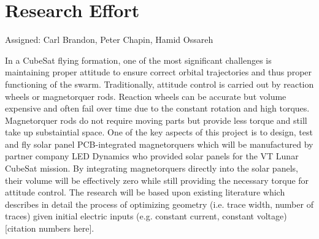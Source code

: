 \section{Research Effort}
Assigned: Carl Brandon, Peter Chapin, Hamid Ossareh

In a CubeSat flying formation, one of the most significant challenges
is maintaining proper attitude to ensure correct orbital trajectories
and thus proper functioning of the swarm. Traditionally, attitude
control is carried out by reaction wheels or magnetorquer
rods. Reaction wheels can be accurate but volume expensive and often
fail over time due to the constant rotation and high
torques. Magnetorquer rods do not require moving parts but provide
less torque and still take up substaintial space. One of the key
aspects of this project is to design, test and fly solar panel
PCB-integrated magnetorquers which will be manufactured by partner
company LED Dynamics who provided solar panels for the VT Lunar
CubeSat mission. By integrating magnetorquers directly into the solar
panels, their volume will be effectively zero while still providing
the necessary torque for attitude control. The research will be based
upon existing literature which describes in detail the process of
optimizing geometry (i.e. trace width, number of traces) given initial
electric inputs (e.g. constant current, constant voltage)[citation
  numbers here].

